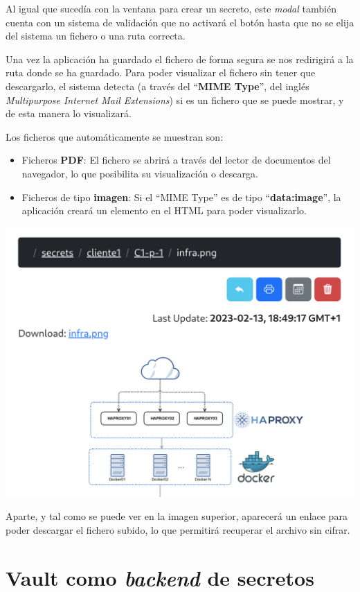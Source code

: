 \documentclass{\ClassPath/viu-tfm-template}
\begin{document}
Al igual que sucedía con la ventana para crear un secreto, este \textit{modal} también cuenta con un sistema de validación que no activará el botón hasta que no se elija del sistema un fichero o una ruta correcta.

Una vez la aplicación ha guardado el fichero de forma segura se nos redirigirá a la ruta donde se ha guardado. Para poder visualizar el fichero sin tener que descargarlo, el sistema detecta (a través del “\textbf{MIME Type}”, del inglés \textit{Multipurpose Internet Mail Extensions}) si es un fichero que se puede mostrar, y de esta manera lo visualizará.

Los ficheros que automáticamente se muestran son:

\begin{itemize}
    \item Ficheros \textbf{PDF}: El fichero se abrirá a través del lector de documentos del navegador, lo que posibilita su visualización o descarga.
    \item Ficheros de tipo \textbf{imagen}: Si el “MIME Type” es de tipo “\textbf{data:image}”, la aplicación creará un elemento en el HTML para poder visualizarlo.
\end{itemize}

\begin{center}
    \includegraphics[frame,width=0.7\linewidth]{img/upload_download.png}
\end{center}

Aparte, y tal como se puede ver en la imagen superior, aparecerá un enlace para poder descargar el fichero subido, lo que permitirá recuperar el archivo sin cifrar.



\section{Vault como \textit{backend} de secretos}
\end{document}

